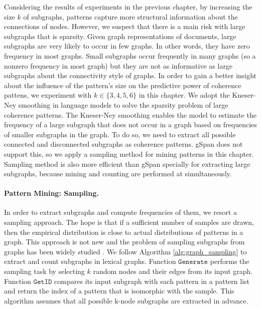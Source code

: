 Considering the results of experiments in the previous chapter, 
by increasing the size $k$ of subgraphs, patterns capture more
structural information about the connections of nodes. 
However, we suspect that there is a main risk with large subgraphs that is sparsity. 
Given graph representations of documents, large subgraphs are very likely to  occur in few graphs.  
In other words, they have zero frequency in most graphs. 
Small subgraphs occur frequently in many graphs (so a nonzero frequency in most graph) but
they are not as informative as large subgraphs about the
connectivity style of graphs. 
In order to gain a better insight about the influence of the pattern's size on the predictive power of coherence pattens, we experiment with $k \in \{3,4,5,6\}$ in this chapter.   
We adopt the \mbox{Kneser-Ney} smoothing in language models \cite{heafield13} to solve the sparsity problem of large coherence patterns. 
The \mbox{Kneser-Ney} smoothing enables the model to estimate the frequency of a large subgraph that does not occur in a graph based on frequencies of smaller subgraphs in the graph. 
To do so, we need to extract all possible connected and disconnected \knode subgraphs as coherence patterns.  
gSpan does not support this, so we apply a sampling method for  mining patterns in this chapter. 
Sampling method is also more efficient than gSpan specially for extracting large subgraphs, because mining and counting are performed at simultaneously.  

\paragraph{Pattern Mining: Sampling. }
In order to extract \knode subgraphs and compute frequencies of them, we resort a sampling approach.  
The hope is that if a sufficient number of samples are drawn, then the empirical distribution is close to actual distributions of patterns in a graph. 
This approach is not new and the problem of sampling subgraphs from graphs has been widely studied \cite{weissman03,shervashidze09}. 
%
We follow Algorithm \ref{alg:graph_sampling} to extract and count subgraphs in lexical graphs. 
Function $\mathtt{Generate}$ performs the sampling task by selecting $k$ random nodes and their edges from its input graph. 
Function $\mathtt{GetID}$ compares its input subgraph with each pattern in a pattern list and return the index of a pattern that is isomorphic with the sample. 
This algorithm assumes that all possible k-node subgraphs are extracted in advance.  



